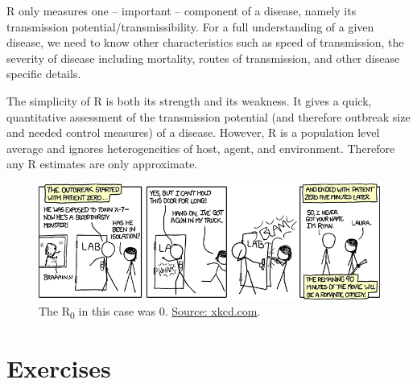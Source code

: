 \documentclass[]{book}
\theoremstyle{definition}
\theoremstyle{definition}
\theoremstyle{definition}
\theoremstyle{remark}
\begin{document}
R only measures one -- important -- component of a disease, namely its
transmission potential/transmissibility. For a full understanding of a
given disease, we need to know other characteristics such as speed of
transmission, the severity of disease including mortality, routes of
transmission, and other disease specific details.

The simplicity of R is both its strength and its weakness. It gives a
quick, quantitative assessment of the transmission potential (and
therefore outbreak size and needed control measures) of a disease.
However, R is a population level average and ignores heterogeneities of
host, agent, and environment. Therefore any R estimates are only
approximate.

\begin{figure}
\centering
\includegraphics{./images/xkcd-outbreak-control.png}
\caption{\label{fig:xkcd-outbreak-control}The R\textsubscript{0} in this
case was 0. \href{https://xkcd.com/734/}{Source: xkcd.com}.}
\end{figure}

\section{Exercises}\label{exercises-3}
\end{document}
